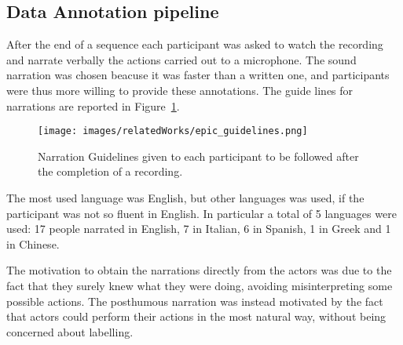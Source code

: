 \subsection{Data Annotation pipeline}
After the end of a sequence each participant was asked to watch the recording and narrate verbally the actions
carried out to a microphone. The sound narration was chosen beacuse it was faster than a written one, and 
participants were thus more willing to provide these annotations.
The guide lines for narrations are reported in Figure~\ref{fig:epic_guidelines}.

\begin{figure}
    \centering
    \texttt{[image: images/relatedWorks/epic\_guidelines.png]} %
    \caption{Narration Guidelines given to each participant to be followed after the completion of a recording.}\label{fig:epic_guidelines}
\end{figure}

The most used language was English, but other languages was used, if the participant was not so fluent in English. In particular
a total of 5 languages were used: 17 people narrated in English, 7 in Italian, 6 in Spanish, 1 in Greek and 1 in Chinese.

The motivation to obtain the narrations directly from the actors was due to the fact that they surely knew what they were doing,
avoiding misinterpreting some possible actions. The posthumous narration was instead motivated by the fact that actors could
perform their actions in the most natural way, without being concerned about labelling.

